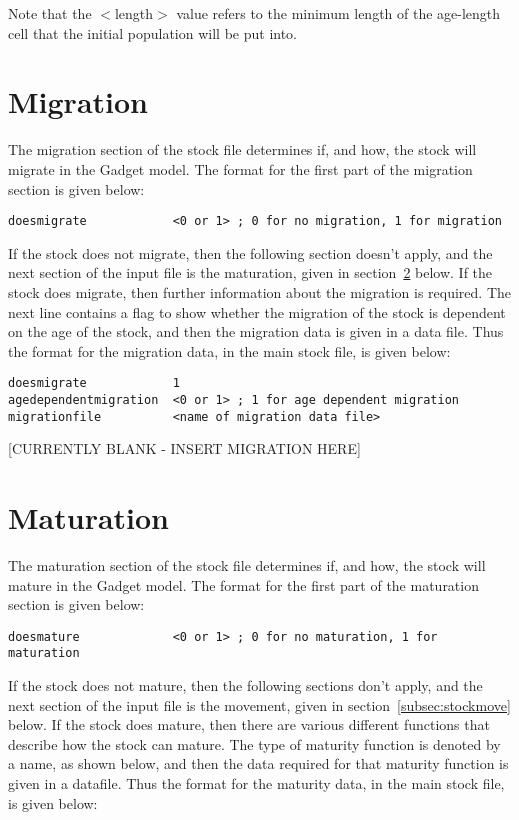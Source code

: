 \documentclass [a4paper, 10pt]{book}
\begin{document}
Note that the $<$length$>$ value refers to the minimum length of the age-length cell that the initial population will be put into.

\section{Migration}\label{subsec:stockmigrate}
The migration section of the stock file determines if, and how, the stock will migrate in the Gadget model. The format for the first part of the migration section is given below:

{\small\begin{verbatim}
doesmigrate            <0 or 1> ; 0 for no migration, 1 for migration
\end{verbatim}}

If the stock does not migrate, then the following section doesn't apply, and the next section of the input file is the maturation, given in section~\ref{subsec:stockmature} below.  If the stock does migrate, then further information about the migration is required.  The next line contains a flag to show whether the migration of the stock is dependent on the age of the stock, and then the migration data is given in a data file.  Thus the format for the migration data, in the main stock file, is given below:

{\small\begin{verbatim}
doesmigrate            1
agedependentmigration  <0 or 1> ; 1 for age dependent migration
migrationfile          <name of migration data file>
\end{verbatim}}

[CURRENTLY BLANK - INSERT MIGRATION HERE]

\section{Maturation}\label{subsec:stockmature}
The maturation section of the stock file determines if, and how, the stock will mature in the Gadget model. The format for the first part of the maturation section is given below:

{\small\begin{verbatim}
doesmature             <0 or 1> ; 0 for no maturation, 1 for maturation
\end{verbatim}}

If the stock does not mature, then the following sections don't apply, and the next section of the input file is the movement, given in section~\ref{subsec:stockmove} below.  If the stock does mature, then there are various different functions that describe how the stock can mature.  The type of maturity function is denoted by a name, as shown below, and then the data required for that maturity function is given in a datafile.  Thus the format for the maturity data, in the main stock file, is given below:
\end{document}
